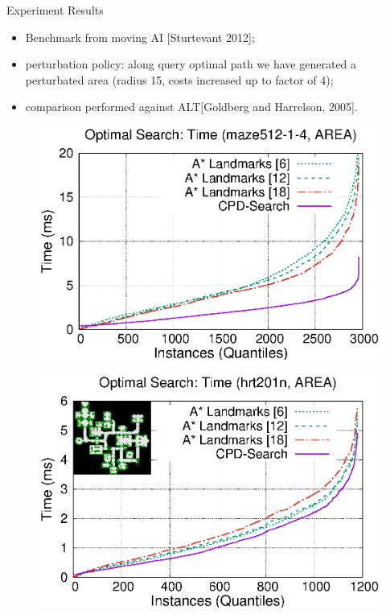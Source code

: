 \begin{frame}{Experiment Results}
    \begin{itemize}
        \item Benchmark from moving AI [Sturtevant 2012];
        \item perturbation policy: along query optimal path we have generated a perturbated area (radius 15, costs increased up to factor of 4);
        \item comparison performed against ALT[Goldberg and Harrelson, 2005].
    \end{itemize}

    \begin{adjustwidth}{-2.5em}{-2.5em}
        \begin{minipage}{0.59\textwidth}
            \begin{figure}
                \centering
                \includegraphics[width=1.0\textwidth]{src/images/pathfinding/optimal/maze512-1-4}
            \end{figure}
        \end{minipage}%
        \begin{minipage}{0.59\textwidth}
            \begin{figure}
                \centering
                \includegraphics[width=1.0\textwidth]{src/images/pathfinding/optimal/hrt201n}
            \end{figure}
        \end{minipage}
    \end{adjustwidth}
\end{frame}